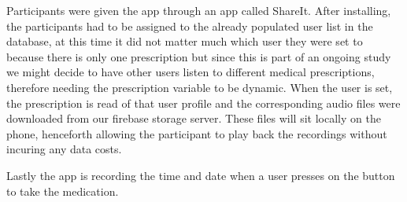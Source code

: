 Participants were given the app through an app called ShareIt. After installing, the participants had to be assigned to the already populated user list in the database, at this time it did not matter much which user they were set to because there is only one prescription but since this is part of an ongoing study we might decide to have other users listen to different medical prescriptions, therefore needing the prescription variable to be dynamic. When the user is set, the prescription is read of that user profile and the corresponding audio files were downloaded from our firebase storage server. These files will sit locally on the phone, henceforth allowing the participant to play back the recordings without incuring any data costs.

Lastly the app is recording the time and date when a user presses on the button to take the medication.
